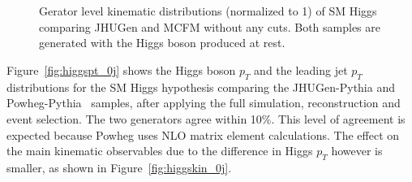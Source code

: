 \begin{figure}[!hbtp]
{}\\
\\
\caption{Gerator level kinematic distributions (normalized to 1) of SM Higgs 
comparing JHUGen and MCFM without any cuts. Both samples are generated with 
the Higgs boson produced at rest. }
\label{fig:jhuvsmcfm}
\end{figure}

Figure~\ref{fig:higgspt_0j} shows the Higgs boson $p_T$ and the leading jet 
$p_T$ distributions for the SM Higgs hypothesis comparing the 
JHUGen-Pythia and Powheg-Pythia~\cite{powheg} samples, after applying the full 
simulation, reconstruction and event selection. The two generators agree within 10\%. 
This level of agreement is expected because Powheg uses
NLO matrix element calculations.
The effect on the main kinematic observables due to 
the difference in Higgs $p_T$ however is smaller, as shown in Figure~\ref{fig:higgskin_0j}. 

